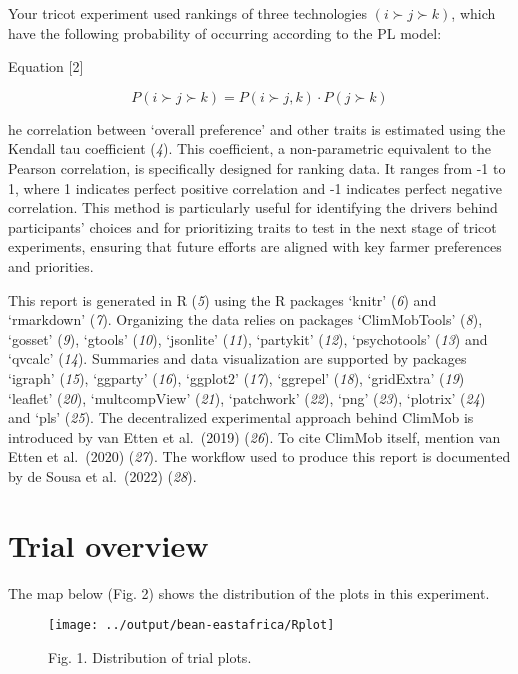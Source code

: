 \documentclass[
]{article}
\begin{document}
Your tricot experiment used rankings of three technologies
\((i \succ j \succ k)\), which have the following probability of
occurring according to the PL model:

Equation {[}2{]}

\[P(i \succ j \succ k) = P(i \succ {j,k}) \cdot P(j \succ k)\]

he correlation between `overall preference' and other traits is
estimated using the Kendall tau coefficient (\emph{4}). This
coefficient, a non-parametric equivalent to the Pearson correlation, is
specifically designed for ranking data. It ranges from -1 to 1, where 1
indicates perfect positive correlation and -1 indicates perfect negative
correlation. This method is particularly useful for identifying the
drivers behind participants' choices and for prioritizing traits to test
in the next stage of tricot experiments, ensuring that future efforts
are aligned with key farmer preferences and priorities.

This report is generated in R (\emph{5}) using the R packages `knitr'
(\emph{6}) and `rmarkdown' (\emph{7}). Organizing the data relies on
packages `ClimMobTools' (\emph{8}), `gosset' (\emph{9}), `gtools'
(\emph{10}), `jsonlite' (\emph{11}), `partykit' (\emph{12}),
`psychotools' (\emph{13}) and `qvcalc' (\emph{14}). Summaries and data
visualization are supported by packages `igraph' (\emph{15}), `ggparty'
(\emph{16}), `ggplot2' (\emph{17}), `ggrepel' (\emph{18}), `gridExtra'
(\emph{19}) `leaflet' (\emph{20}), `multcompView' (\emph{21}),
`patchwork' (\emph{22}), `png' (\emph{23}), `plotrix' (\emph{24}) and
`pls' (\emph{25}). The decentralized experimental approach behind
ClimMob is introduced by van Etten et al.~(2019) (\emph{26}). To cite
ClimMob itself, mention van Etten et al.~(2020) (\emph{27}). The
workflow used to produce this report is documented by de Sousa et
al.~(2022) (\emph{28}).

\pagebreak

\section{Trial overview}\label{trial-overview}

The map below (Fig. 2) shows the distribution of the plots in this
experiment.

\begin{figure}
\texttt{[image: ../output/bean-eastafrica/Rplot]} \caption{Fig. 1. Distribution of trial plots.}\label{fig:map}
\end{figure}
\end{document}
